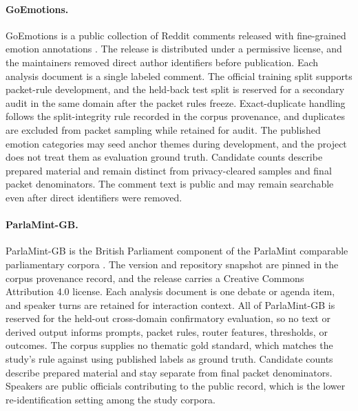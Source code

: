 \paragraph{GoEmotions.}
GoEmotions is a public collection of Reddit comments released with fine-grained emotion annotations \citep{demszky2020goemotions}. The release is distributed under a permissive license, and the maintainers removed direct author identifiers before publication. Each analysis document is a single labeled comment. The official training split supports packet-rule development, and the held-back test split is reserved for a secondary audit in the same domain after the packet rules freeze. Exact-duplicate handling follows the split-integrity rule recorded in the corpus provenance, and duplicates are excluded from packet sampling while retained for audit. The published emotion categories may seed anchor themes during development, and the project does not treat them as evaluation ground truth. Candidate counts describe prepared material and remain distinct from privacy-cleared samples and final packet denominators. The comment text is public and may remain searchable even after direct identifiers were removed.

\paragraph{ParlaMint-GB.}
ParlaMint-GB is the British Parliament component of the ParlaMint comparable parliamentary corpora \citep{erjavec2023parlamint}. The version and repository snapshot are pinned in the corpus provenance record, and the release carries a Creative Commons Attribution 4.0 license. Each analysis document is one debate or agenda item, and speaker turns are retained for interaction context. All of ParlaMint-GB is reserved for the held-out cross-domain confirmatory evaluation, so no text or derived output informs prompts, packet rules, router features, thresholds, or outcomes. The corpus supplies no thematic gold standard, which matches the study's rule against using published labels as ground truth. Candidate counts describe prepared material and stay separate from final packet denominators. Speakers are public officials contributing to the public record, which is the lower re-identification setting among the study corpora.
